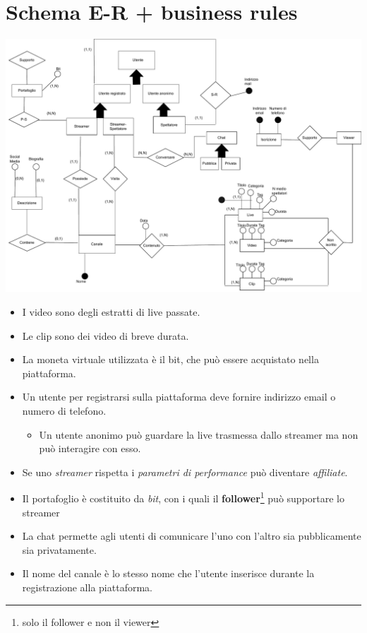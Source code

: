 \section{Schema E-R + business rules }
\includegraphics[width=\textwidth]{resources/schema_e-r.pdf}
\begin{itemize}
    \item I video sono degli estratti di live passate.
    \item Le clip sono dei video di breve durata.
    \item La moneta virtuale utilizzata è il bit, che può essere acquistato nella piattaforma.
    \item Un utente per registrarsi sulla piattaforma deve fornire indirizzo email o numero di telefono.
    \begin{itemize}
        \item Un utente anonimo può guardare la live trasmessa dallo streamer ma non può interagire con esso. 
    \end{itemize}
        \item Se uno \textit{streamer} rispetta i \textit{parametri di performance} può diventare \textit{affiliate}.
        \item Il portafoglio è costituito da \textit{bit}, con i quali il \textbf{follower}\footnote{solo il follower e non il viewer} può supportare lo streamer
        \item La chat permette agli utenti di comunicare l'uno con l'altro sia pubblicamente sia privatamente.
        \item Il nome del canale è lo stesso nome che l'utente inserisce durante la registrazione alla piattaforma.
\end{itemize}